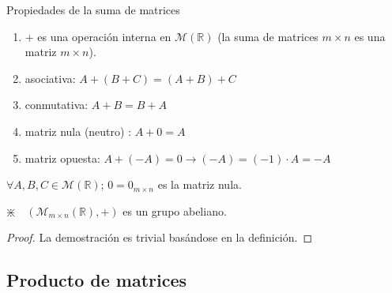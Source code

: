 \begin{prop}{Propiedades de la suma de matrices}
\begin{enumerate}
	\item $+$ es una operación interna en $\mathcal M(\mathbb R)$ (la suma de matrices $m\times n$ es una matriz $m \times n$).
	\item asociativa: $A+(B+C)=(A+B)+C$
	\item conmutativa: $A+B=B+A$
	\item matriz nula (neutro) : $A+0=A$
	\item matriz opuesta: $A+(-A)=0 \to (-A)=(-1)\cdot A=-A$
	
\end{enumerate}
\hspace{1cm} $\forall A,B,C \in \mathcal M(\mathbb R)$; $0=0_{m\times n}$ es la matriz nula.

\hspace{1cm}\textcolor{gris}{$\divideontimes \quad \left( \mathcal M_{m\times n}(\mathbb R),+ \right) $ es un grupo abeliano.}
\end{prop}
\begin{proof}
La demostración es trivial basándose en la definición.	
\end{proof}


\subsection{Producto de matrices}

